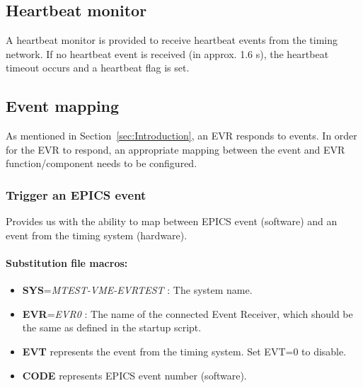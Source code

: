 \documentclass[12pt,a4paper]{article}
\begin{document}
\subsection{Heartbeat monitor}\label{sec:Heartbeat monitor}
A heartbeat monitor is provided to receive heartbeat events from the timing network. If no heartbeat event is received (in approx. 1.6 s), the heartbeat timeout occurs and a heartbeat flag is set. 


\subsection{Event mapping}\label{sec:Event mapping}
As mentioned in Section~\ref{sec:Introduction}, an EVR responds to events. In order for the EVR to respond, an appropriate mapping between the event and  EVR function/component needs to be configured.



\subsubsection{Trigger an EPICS event}\label{evr-softevent.template}
Provides us with the ability to map between EPICS event (software) and an event from the timing system (hardware).

\paragraph{Substitution file macros:}
\begin{itemize}
	\item
		\textbf{SYS}=\emph{MTEST-VME-EVRTEST} : The system name.
	\item
		\textbf{EVR}=\emph{EVR0} : The name of the connected Event Receiver, which should be the same as defined in the startup script. 
	\item
	  \textbf{EVT} represents the event from the timing system. Set EVT=0 to disable.
	\item
	  \textbf{CODE} represents EPICS event number (software).
\end{itemize}
\end{document}
